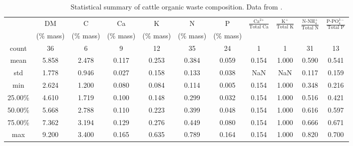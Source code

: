 \begin{refsection}[referencesCh3]
\begin{table}
	\centering
	\caption{Statistical summary of cattle organic waste composition. Data from \protect\citep{Alburquerque,Bolzonella,Seppala,Gell,Normak,Sorensen,Tampere,Moset,Zheng,Xia,Moller,WRAP,ADAS,Risgberg,Ledda,Kirchmann,Moller2,Walsh,Loes,Martin2}.} \label{table:dig_compt_stats}
	\begin{tabular}{ c c c c c c c c c c c}
		\toprule
		&DM		&C		&Ca		&K		&N		&P		&\multirow{2}{*}{\Large{$\frac{\text{Ca}^{\text{2+}}}{\text{Total Ca}}$}}	&\multirow{2}{*}{\Large{$\frac{\text{K}^{\text{+}}}{\text{Total K}}$}}	&\multirow{2}{*}{\Large{$\frac{\text{N-NH}^{+}_{4}}{\text{Total N}}$}}	&\multirow{2}{*}{\Large{$\frac{\text{P-PO}^{3-}_{4}}{\text{Total P}}$}}	\\	
		&(\% mass)		&(\% mass)		&(\% mass)		&(\% mass)		&(\% mass)		&(\% mass)		&	&	&	&	\\ \midrule
		count		&36		&6		&9		&12		&35		&24		&1			&1		&31			&13			\\ 
		mean		&5.858	&2.478	&0.117	&0.253	&0.384	&0.059	&0.154		&1.000	&0.590		&0.541		\\ 
		std		&1.778	&0.946	&0.027	&0.158	&0.133	&0.038	&NaN		&NaN	&0.117		&0.159		\\ 
		min		&2.624	&1.200	&0.080	&0.084	&0.114	&0.005	&0.154		&1.000	&0.348		&0.216		\\ 
		25.00\%	&4.610	&1.719	&0.100	&0.148	&0.299	&0.032	&0.154		&1.000	&0.516		&0.421		\\ 
		50.00\%	&5.668	&2.788	&0.110	&0.223	&0.399	&0.048	&0.154		&1.000	&0.616		&0.597		\\ 
		75.00\%	&7.362	&3.194	&0.129	&0.276	&0.449	&0.080	&0.154		&1.000	&0.666		&0.671		\\ 
		max		&9.200	&3.400	&0.165	&0.635	&0.789	&0.164	&0.154		&1.000	&0.820		&0.700		\\ \bottomrule
	\end{tabular}
\end{table}


\end{refsection}
